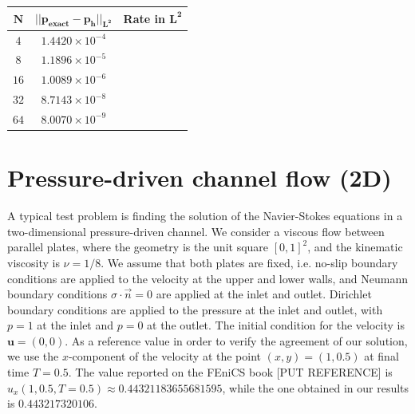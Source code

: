 \documentclass[11pt,a4paper,titlepage]{report}
\begin{document}
\begin{center}
\begin{tabular}{| c | c | c |}
\hline
$\mathbf{N}$ & $\mathbf{|| p_{exact} - p_h ||_{L^2}}$ & \textbf{Rate in } $  \mathbf{L^2}$  \\
\hline
$ 4 $ & $1.4420  \times 10^{-4} $ &  \\
\hline
$ 8 $ & $ 1.1896  \times 10^{-5} $ &  \\
\hline
$ 16 $ & $ 1.0089  \times 10^{-6} $   & \\
\hline
$ 32 $ & $  8.7143 \times 10^{-8} $  & \\
\hline
$ 64 $ & $ 8.0070 \times 10^{-9} $ & \\
\hline
\end{tabular}
\end{center}




\section{Pressure-driven channel flow (2D)}


A typical test problem is finding the solution of the Navier-Stokes equations in a two-dimensional pressure-driven channel. We consider a viscous flow between parallel plates, where the geometry is the unit square $[0,1]^2$, and the kinematic viscosity is $\nu = 1/8$. We assume that both plates are fixed, i.e. no-slip boundary conditions are applied to the velocity at the upper and lower walls, and Neumann boundary conditions $\sigma \cdot \vec{n} = 0$ are applied at the inlet and outlet. Dirichlet boundary conditions are applied to the pressure at the inlet and outlet, with $p = 1$ at the inlet and $p = 0$ at the outlet. The initial condition for the velocity is $\mathbf{u} = (0,0)$. As a reference value in order to verify the agreement of our solution, we use the $x$-component of the velocity at the point $(x, y) = (1, 0.5)$ at final time $T = 0.5 $. The value reported on the FEniCS book [PUT REFERENCE] is $u_x(1, 0.5, T=0.5) \approx 0.44321183655681595$, while the one obtained in our results is $0.443217320106$.
\end{document}
